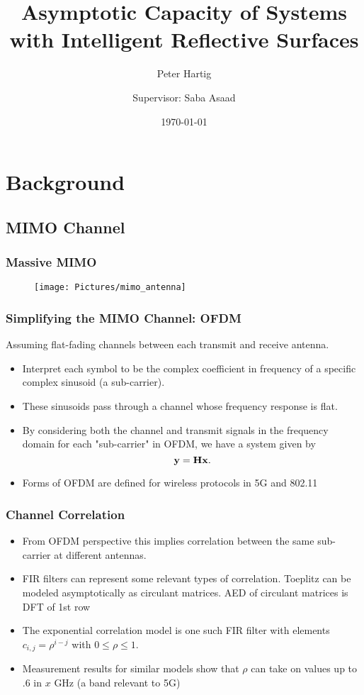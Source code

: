 \documentclass[10pt,tgadventor, onlymath]{beamer}
\title{\large \bfseries Asymptotic Capacity of Systems with Intelligent Reflective Surfaces}
\author{Peter Hartig \\ \and Supervisor: Saba Asaad}
\date{\today}
\begin{document}
\frame{
\thispagestyle{empty}
\titlepage
}

\section{Background}
\subsection{MIMO Channel}

\begin{frame}
\frametitle{Massive MIMO}
				\centering
		\begin{figure}
		\texttt{[image: Pictures/mimo\_antenna]}
	\end{figure}
	\cite{argos2020}
\end{frame}

\begin{frame}
\frametitle{Simplifying the MIMO Channel: OFDM}
Assuming flat-fading channels between each transmit and receive antenna.
	\begin{itemize}
		\item 			
			Interpret each symbol to be the complex coefficient in frequency of a specific complex sinusoid (a sub-carrier). 
		\item
			These sinusoids pass through a channel whose frequency response is flat.
		\item
			By considering both the channel and transmit signals in the frequency domain for each "sub-carrier" in OFDM, we have a system given by
			\begin{equation}
				\mathbf{y} = \mathbf{H} \mathbf{x}.
			\end{equation}
		\item 
			Forms of OFDM are defined for wireless protocols in 5G and 802.11
	\end{itemize}
\end{frame}

\begin{frame}
\frametitle{Channel Correlation}
	\begin{itemize}
		\item 
			From OFDM perspective this implies correlation between the same sub-carrier at different antennas.
		\item 
			FIR filters can represent some relevant types of correlation.
			Toeplitz can be modeled asymptotically as circulant matrices. AED of circulant matrices is DFT of 1st row
		\item
			The exponential correlation model is one such FIR filter with elements $c_{i,j} = \rho^{i-j} $ with $ 0 \leq \rho \leq 1$.
		\item 
			Measurement results for similar models show that $\rho$ can take on values up to $.6$ in $x$ GHz (a band relevant to 5G)
	\end{itemize}
\end{frame}
\end{document}
